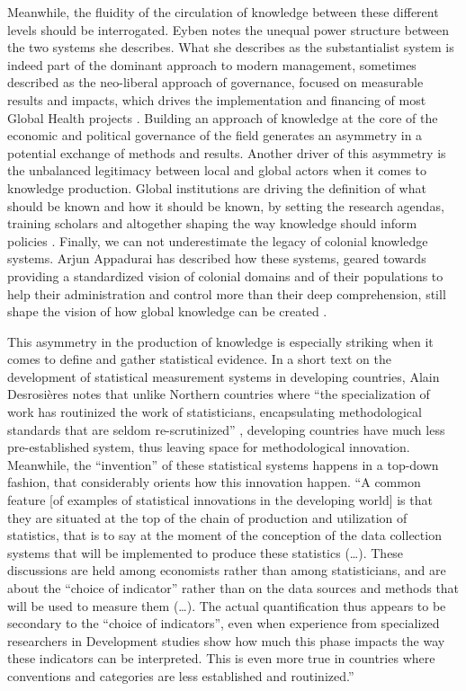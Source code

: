 Meanwhile, the fluidity of the circulation of knowledge between these different levels should be interrogated. Eyben notes the unequal power structure between the two systems she describes. What she describes as the substantialist system is indeed part of the dominant approach to modern management, sometimes described as the neo-liberal approach of governance, focused on measurable results and impacts, which drives the implementation and financing of most Global Health projects . Building an approach of knowledge at the core of the economic and political governance of the field generates an asymmetry in a potential exchange of methods and results. Another driver of this asymmetry is the unbalanced legitimacy between local and global actors when it comes to knowledge production. Global institutions are driving the definition of what should be known and how it should be known, by setting the research agendas, training scholars and altogether shaping the way knowledge should inform policies . Finally, we can not underestimate the legacy of colonial knowledge systems. Arjun Appadurai  has described how these systems, geared towards providing a standardized vision of colonial domains and of their populations to help their administration and control more than their deep comprehension, still shape the vision of how global knowledge can be created \citep{appadurai_number_1996}.

This asymmetry in the production of knowledge is especially striking when it comes to define and gather statistical evidence. In a short text on the development of statistical measurement systems in developing countries, Alain Desrosières notes that unlike Northern countries where “the specialization of work has routinized the work of statisticians, encapsulating methodological standards that are seldom re-scrutinized” , developing countries have much less pre-established system, thus leaving space for methodological innovation. Meanwhile, the “invention” of these statistical systems happens in a top-down fashion, that considerably orients how this innovation happen. “A common feature [of examples of statistical innovations in the developing world] is that they are situated at the top of the chain of production and utilization of statistics, that is to say at the moment of the conception of the data collection systems that will be implemented to produce these statistics (…). These discussions are held among economists rather than among statisticians, and are about the “choice of indicator” rather than on the data sources and methods that will be used to measure them (…). The actual quantification thus appears to be secondary to the “choice of indicators”, even when experience from specialized researchers in Development studies show how much this phase impacts the way these indicators can be interpreted. This is even more true in countries where conventions and categories are less established and routinized.” \citep{desrosieres_pays_2014}

